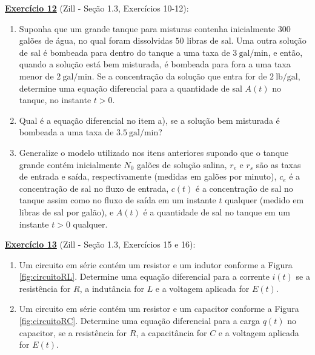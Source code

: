 \documentclass[oneside,12pt,a4paper]{report}
\begin{document}
    \noindent\textbf{\hyperlink{resp:ex12}{\hypertarget{quest:ex12}{Exercício 12}}} (Zill - Seção 1.3, Exercícios 10-12):
    \begin{enumerate}[label=\alph*)]
        \item Suponha que um grande tanque para misturas contenha inicialmente $300$ galões de água, no qual foram dissolvidas $50$ libras de sal. Uma outra solução de sal é bombeada para dentro do tanque a uma taxa de $3~\mathrm{gal/min}$, e então, quando a solução está bem misturada, é bombeada para fora a uma taxa menor de $2~\mathrm{gal/min}$. Se a concentração da solução que entra for de $2~\mathrm{lb/gal}$, determine uma equação diferencial para a quantidade de sal $A(t)$ no tanque, no instante $t > 0$.
        \item Qual é a equação diferencial no item a), se a solução bem misturada é bombeada a uma taxa de $3.5~\mathrm{gal/min}$?
        \item Generalize o modelo utilizado nos itens anteriores supondo que o tanque grande contém inicialmente $N_0$ galões de solução salina, $r_e$ e $r_s$ são as taxas de entrada e saída, respectivamente (medidas em galões por minuto), $c_e$ é a concentração de sal no fluxo de entrada, $c(t)$ é a concentração de sal no tanque assim como no fluxo de saída em um instante $t$ qualquer (medido em libras de sal por galão), e $A(t)$ é a quantidade de sal no tanque em um instante $t > 0$ qualquer.
    \end{enumerate}
    \vspace{0.5cm}

    \noindent\textbf{\hyperlink{resp:ex13}{\hypertarget{quest:ex13}{Exercício 13}}} (Zill - Seção 1.3, Exercícios 15 e 16):
    \begin{enumerate}[label=\alph*)]
        \item Um circuito em série contém um resistor e um indutor conforme a Figura \ref{fig:circuitoRL}. Determine uma equação diferencial para a corrente $i(t)$ se a resistência for $R$, a indutância for $L$ e a voltagem aplicada for $E(t)$.
        \item Um circuito em série contém um resistor e um capacitor conforme a Figura \ref{fig:circuitoRC}. Determine uma equação diferencial para a carga $q(t)$ no capacitor, se a resistência for $R$, a capacitância for $C$ e a voltagem aplicada for $E(t)$.
    \end{enumerate}
\end{document}
